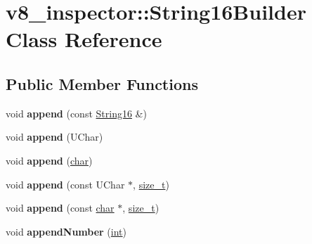 \hypertarget{classv8__inspector_1_1String16Builder}{}\section{v8\+\_\+inspector\+:\+:String16\+Builder Class Reference}
\label{classv8__inspector_1_1String16Builder}
\subsection*{Public Member Functions}
\begin{DoxyCompactItemize}
\item 
\mbox{\label{classv8__inspector_1_1String16Builder_a38eb95a44f6329225971567ab717b91a}} 
void {\bfseries append} (const \mbox{\hyperlink{classv8__inspector_1_1String16}{String16}} \&)
\item 
\mbox{\label{classv8__inspector_1_1String16Builder_a1f03862354ab3f68b24fde6c25ad0a07}} 
void {\bfseries append} (U\+Char)
\item 
\mbox{\label{classv8__inspector_1_1String16Builder_a65cf8aa4baefa9c2245cdd33da504d2d}} 
void {\bfseries append} (\mbox{\hyperlink{classchar}{char}})
\item 
\mbox{\label{classv8__inspector_1_1String16Builder_a1a5b5e6bd328e1d537c59100bddd07c8}} 
void {\bfseries append} (const U\+Char $\ast$, \mbox{\hyperlink{classsize__t}{size\+\_\+t}})
\item 
\mbox{\label{classv8__inspector_1_1String16Builder_a033349f63b40140e999dfdef1afab4c4}} 
void {\bfseries append} (const \mbox{\hyperlink{classchar}{char}} $\ast$, \mbox{\hyperlink{classsize__t}{size\+\_\+t}})
\item 
\mbox{\label{classv8__inspector_1_1String16Builder_a472b44a2e6c01b087cd10eb2140139b4}} 
void {\bfseries append\+Number} (\mbox{\hyperlink{classint}{int}})
\item 
\mbox{\label{classv8__inspector_1_1String16Builder_a3d24d24e2c8919b845ce7c8aa4a064ce}} 

\end{DoxyCompactItemize}
